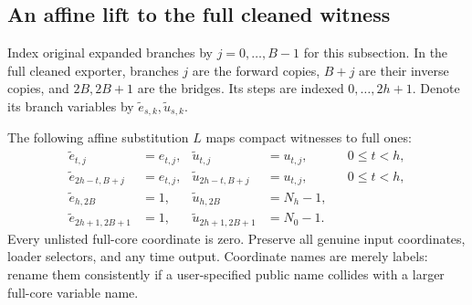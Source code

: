 \documentclass[11pt,letterpaper]{article}
\numberwithin{equation}{section}
\theoremstyle{definition}
\theoremstyle{remark}
\begin{document}
\subsection{An affine lift to the full cleaned witness}\label{smc:ct:sec:lift}

Index original expanded branches by $j=0,\ldots,B-1$ for this subsection. In the full cleaned exporter, branches $j$ are the forward copies, $B+j$ are their inverse copies, and $2B,2B+1$ are the bridges. Its steps are indexed $0,\ldots,2h+1$. Denote its branch variables by $\widetilde e_{s,k},\widetilde u_{s,k}$.

The following affine substitution $L$ maps compact witnesses to full ones:
\begin{align}
\widetilde e_{t,j}&=e_{t,j},&\widetilde u_{t,j}&=u_{t,j},&&0\le t<h,\label{smc:ct:eq:liftF}\\
\widetilde e_{2h-t,B+j}&=e_{t,j},&\widetilde u_{2h-t,B+j}&=u_{t,j},&&0\le t<h,\label{smc:ct:eq:liftB}\\
\widetilde e_{h,2B}&=1,&\widetilde u_{h,2B}&=N_h-1,\label{smc:ct:eq:liftbridge1}\\
\widetilde e_{2h+1,2B+1}&=1,&\widetilde u_{2h+1,2B+1}&=N_0-1.\label{smc:ct:eq:liftbridge2}
\end{align}
Every unlisted full-core coordinate is zero. Preserve all genuine input coordinates, loader selectors, and any time output. Coordinate names are merely labels: rename them consistently if a user-specified public name collides with a larger full-core variable name.
\end{document}
